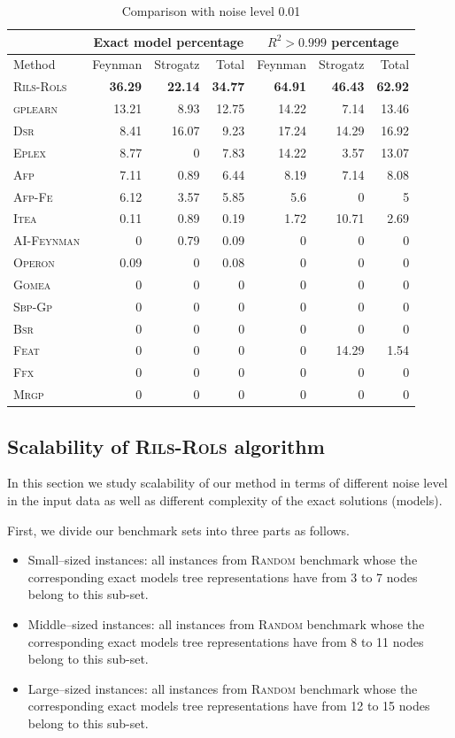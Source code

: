 \documentclass[a4paper,12pt]{elsarticle}
\begin{document}
\begin{table}[!htb]
	\caption{Comparison with noise level 0.01}\label{tab:comp_noise001}
	\centering
	\begin{tabular}{l|rrr|rrr} \hline
		& \multicolumn{3}{c|}{Exact model percentage} & \multicolumn{3}{c}{$R^2 > 0.999$ percentage}\\ \hline
		Method & Feynman & Strogatz & Total & Feynman & Strogatz & Total \\ \hline
		\textsc{Rils-Rols}&\bf{36.29}&\bf{22.14}&\bf{34.77}&\bf{64.91}&\bf{46.43}&\bf{62.92}\\
		\textsc{gplearn}&13.21&8.93&12.75&14.22&7.14&13.46\\
		\textsc{Dsr}&8.41&16.07&9.23&17.24&14.29&16.92\\
		\textsc{Eplex}&8.77&0&7.83&14.22&3.57&13.07\\
		\textsc{Afp}&7.11&0.89&6.44&8.19&7.14&8.08\\
		\textsc{Afp-Fe}&6.12&3.57&5.85&5.6&0&5\\
		\textsc{Itea}&0.11&0.89&0.19&1.72&10.71&2.69\\
		\textsc{AI-Feynman}&0&0.79&0.09&0&0&0\\
		\textsc{Operon}&0.09&0&0.08&0&0&0\\
		\textsc{Gomea}&0&0&0&0&0&0\\
		\textsc{Sbp-Gp}&0&0&0&0&0&0\\
		\textsc{Bsr}&0&0&0&0&0&0\\
		\textsc{Feat}&0&0&0&0&14.29&1.54\\
		\textsc{Ffx}&0&0&0&0&0&0\\
		\textsc{Mrgp}&0&0&0&0&0&0\\
		\hline
	\end{tabular}
\end{table}



\subsection{Scalability of \textsc{Rils}-\textsc{Rols} algorithm}

In this section we study scalability of our method in terms of different noise level in the input data as well as different complexity of the exact solutions (models). 

First, we divide our benchmark sets into three parts as follows. 
\begin{itemize}
	\item Small--sized instances: all instances from \textsc{Random} benchmark whose the corresponding exact models tree representations have from 3 to 7 nodes belong to this sub-set.
	\item Middle--sized instances:  all instances from \textsc{Random} benchmark whose the corresponding exact models tree representations have from 8 to 11 nodes belong to this sub-set.
	\item Large--sized instances: all instances from \textsc{Random} benchmark whose the corresponding exact models tree representations have from 12 to 15 nodes belong to this sub-set. 
\end{itemize}
\end{document}

